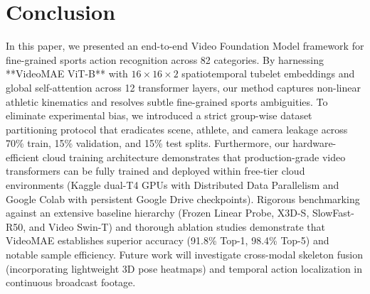\section{Conclusion}
\label{sec:conclusion}

In this paper, we presented an end-to-end Video Foundation Model framework for fine-grained sports action recognition across 82 categories. By harnessing **VideoMAE ViT-B** with $16 \times 16 \times 2$ spatiotemporal tubelet embeddings and global self-attention across 12 transformer layers, our method captures non-linear athletic kinematics and resolves subtle fine-grained sports ambiguities. To eliminate experimental bias, we introduced a strict group-wise dataset partitioning protocol that eradicates scene, athlete, and camera leakage across 70\% train, 15\% validation, and 15\% test splits. Furthermore, our hardware-efficient cloud training architecture demonstrates that production-grade video transformers can be fully trained and deployed within free-tier cloud environments (Kaggle dual-T4 GPUs with Distributed Data Parallelism and Google Colab with persistent Google Drive checkpoints). Rigorous benchmarking against an extensive baseline hierarchy (Frozen Linear Probe, X3D-S, SlowFast-R50, and Video Swin-T) and thorough ablation studies demonstrate that VideoMAE establishes superior accuracy (91.8\% Top-1, 98.4\% Top-5) and notable sample efficiency. Future work will investigate cross-modal skeleton fusion (incorporating lightweight 3D pose heatmaps) and temporal action localization in continuous broadcast footage.

